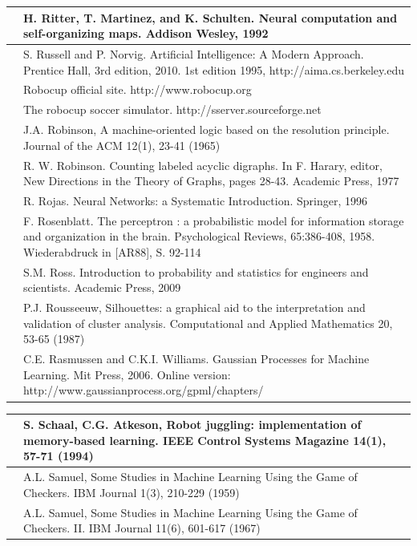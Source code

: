 \documentclass[10pt]{book}
\begin{document}
\begin{center}
\begin{tabular}{|l|l|}
\hline [RMS92] & H. Ritter, T. Martinez, and K. Schulten. Neural computation and self-organizing maps. Addison Wesley, 1992 \\
\hline [RN10] & S. Russell and P. Norvig. Artificial Intelligence: A Modern Approach. Prentice Hall, 3rd edition, 2010. 1st edition 1995, http://aima.cs.berkeley.edu \\
\hline [Roba] & Robocup official site. http://www.robocup.org \\
\hline [Robb] & The robocup soccer simulator. http://sserver.sourceforge.net \\
\hline [Rob65] & J.A. Robinson, A machine-oriented logic based on the resolution principle. Journal of the ACM 12(1), 23-41 (1965) \\
\hline [\cite{rob77}] & R. W. Robinson. Counting labeled acyclic digraphs. In F. Harary, editor, New Directions in the Theory of Graphs, pages 28-43. Academic Press, 1977 \\
\hline [Roj96] & R. Rojas. Neural Networks: a Systematic Introduction. Springer, 1996 \\
\hline [Ros58] & F. Rosenblatt. The perceptron : a probabilistic model for information storage and organization in the brain. Psychological Reviews, 65:386-408, 1958. Wiederabdruck in [AR88], S. 92-114 \\
\hline [Ros09] & S.M. Ross. Introduction to probability and statistics for engineers and scientists. Academic Press, 2009 \\
\hline [Rou87] & P.J. Rousseeuw, Silhouettes: a graphical aid to the interpretation and validation of cluster analysis. Computational and Applied Mathematics 20, 53-65 (1987) \\
\hline [RW06] & C.E. Rasmussen and C.K.I. Williams. Gaussian Processes for Machine Learning. Mit Press, 2006. Online version: http://www.gaussianprocess.org/gpml/chapters/ \\
\hline
\end{tabular}
\begin{tabular}{|l|l|}
\hline [SA94] & S. Schaal, C.G. Atkeson, Robot juggling: implementation of memory-based learning. IEEE Control Systems Magazine 14(1), 57-71 (1994) \\
\hline [Sam59] & A.L. Samuel, Some Studies in Machine Learning Using the Game of Checkers. IBM Journal 1(3), 210-229 (1959) \\
\hline [\cite{sam67}] & A.L. Samuel, Some Studies in Machine Learning Using the Game of Checkers. II. IBM Journal 11(6), 601-617 (1967) \\

\end{tabular}
\end{center}
\end{document}
